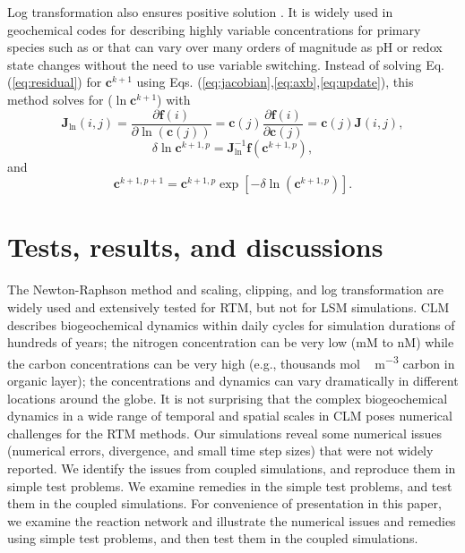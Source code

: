 \documentclass[gmd, manuscript]{copernicus}
\begin{document}
Log transformation also ensures positive solution \citep{Bethke2007,Hammond2003,Parkhurst1999}. It is widely used in geochemical codes for describing highly variable concentrations for primary species such as  or  that can vary over many orders of magnitude as pH or redox state changes without the need to use variable switching. Instead of solving Eq.
(\ref{eq:residual}) for $\mathbf{c}^{k+1}$ using Eqs. (\ref{eq:jacobian},\ref{eq:axb},\ref{eq:update}), this method solves for ($\ln\mathbf{c}^{k+1}$) \citep{Hammond2003} with 
\begin{equation}
\mathbf{J}_{\ln}(i,j)=\frac{\partial \mathbf{f}(i)}{\partial
\ln(\mathbf{c}(j))} = \mathbf{c}(j) \frac{\partial
\mathbf{f}(i)}{\partial \mathbf{c}(j)} = \mathbf{c}(j) \mathbf{J}(i,j),
\label{eq:jacobianlt}
\end{equation}
\begin{equation}
\delta \ln\mathbf{c}^{k+1,p}= \mathbf{J}^{-1}_{\ln} \mathbf{f} (\mathbf{c}^{k+1,p}),
\label{eq:axblt}
\end{equation}
and
\begin{equation}
\mathbf{c}^{k+1,p+1}=\mathbf{c}^{k+1,p}\exp[-\delta
\ln(\mathbf{c}^{k+1,p})].
\label{eq:updatelt}	
\end{equation}

\section{Tests, results, and discussions}
The Newton-Raphson method and scaling, clipping, and log transformation are widely used and extensively tested for RTM, but not for LSM simulations. CLM describes biogeochemical dynamics within daily cycles for simulation durations of hundreds of years; the nitrogen concentration can be very low (\unit{mM} to \unit{nM}) while the carbon concentrations can be very high (e.g., thousands \unit{mol\,m^{-3}} carbon in organic layer); the concentrations and dynamics can vary dramatically in different locations around the globe. It is not surprising that the complex biogeochemical dynamics in a wide range of temporal and spatial scales in CLM poses numerical challenges for the RTM methods. Our simulations reveal some numerical issues (numerical errors, divergence, and small time step sizes) that were not widely reported. We identify the issues from coupled simulations, and reproduce them in simple test problems. We examine remedies in the simple test problems, and test them in the coupled simulations. For convenience of presentation in this paper, we examine the reaction network and illustrate the numerical issues and remedies using simple test problems, and then test them in the coupled simulations. 
\end{document}
